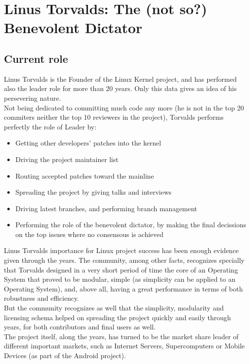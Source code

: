\documentclass[11pt]{article}
\begin{document}
\pagebreak

\section{Linus Torvalds: The (not so?) Benevolent Dictator}
\subsection{Current role}
Linus Torvalds is the Founder of the Linux Kernel project, and has performed also the leader role for more than 20 years. Only this data gives an idea of his persevering nature.\\
Not being dedicated to committing much code any more (he is not in the top 20 commiters neither the top 10 reviewers in the project), Torvalds performs perfectly the role of Leader by:
\begin{itemize}\itemsep0pt
\item{Getting other developers’ patches into the kernel}
\item{Driving the project maintainer list}
\item{Routing accepted patches toward the mainline}
\item{Spreading the project by giving talks and interviews}
\item{Driving latest branches, and performing branch management}
\item{Performing the role of the benevolent dictator, by making the final decissions on the top issues where no consensous is achieved}
\end{itemize}
Linus Torvalds importance for Linux project success has been enough evidence given through the years. The community, among other facts, recognizes specially that Torvalds designed in a very short period of time the core of an Operating System that proved to be modular, simple (as simplicity can be applied to an Operating System), and, above all, having a great performance in terms of both robustness and efficiency.\\
But the community recognizes as well that the simplicity, modularity and licensing schema helped on spreading the project quickly and easily through years, for both contributors and final users as well.\\
The project itself, along the years, has turned to be the market share leader of different important markets, such as Internet Servers, Supercomputers or Mobile Devices (as part of the Android project).
\end{document}
